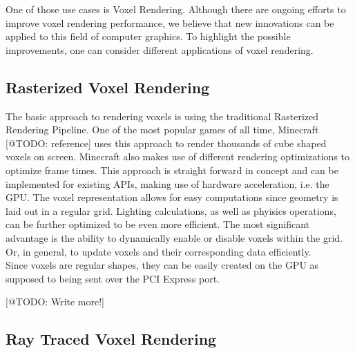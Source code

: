 \noindent
One of those use cases is Voxel Rendering. Although there are ongoing efforts to improve voxel 
rendering performance, we believe that new innovations can be applied to this field of computer 
graphics. To highlight the possible improvements, one can consider different applications of 
voxel rendering. 

\subsection{Rasterized Voxel Rendering}

The basic approach to rendering voxels is using the traditional Rasterized Rendering Pipeline.
One of the most popular games of all time, Minecraft [@TODO: reference] uses this approach to 
render thousands of cube shaped voxels on screen. Minecraft also makes use of different rendering 
optimizations to optimize frame times. This approach is straight forward in concept and can be 
implemented for existing APIs, making use of hardware acceleration, i.e. the \ac{GPU}.
The voxel representation allows for easy computations since geometry is laid out in a regular grid.
Lighting calculations, as well as phyisics operations, can be further optimized to be even more 
efficient. The most significant advantage is the ability to dynamically enable or disable voxels 
within the grid. Or, in general, to update voxels and their corresponding data efficiently.\\

\noindent
Since voxels are regular shapes, they can be easily created on the \ac{GPU} as supposed to being 
sent over the PCI Express port. 

[@TODO: Write more!]


\subsection{Ray Traced Voxel Rendering}

